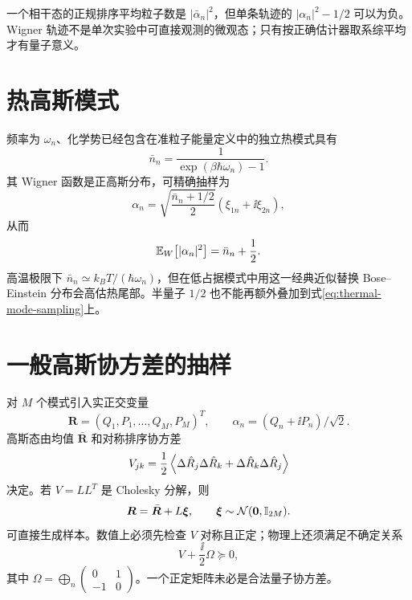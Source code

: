 一个相干态的正规排序平均粒子数是 $|\bar\alpha_n|^2$，但单条轨迹的 $|\alpha_n|^2-1/2$ 可以为负。Wigner 轨迹不是单次实验中可直接观测的微观态；只有按正确估计器取系综平均才有量子意义。

\section{热高斯模式}

频率为 $\omega_n$、化学势已经包含在准粒子能量定义中的独立热模式具有
\begin{equation}
  \bar n_n=\frac{1}{\exp(\beta\hbar\omega_n)-1}.
\end{equation}
其 Wigner 函数是正高斯分布，可精确抽样为
\begin{equation}
  \alpha_n=\sqrt{\frac{\bar n_n+1/2}{2}}
  (\xi_{1n}+\ii\xi_{2n}),
  \label{eq:thermal-mode-sampling}
\end{equation}
从而
\begin{equation}
  \mathbb{E}_{W}\!\left[|\alpha_n|^2\right]=\bar n_n+\frac12.
  \label{eq:thermal-wigner-moment}
\end{equation}
高温极限下 $\bar n_n\simeq k_BT/(\hbar\omega_n)$，但在低占据模式中用这一经典近似替换 Bose--Einstein 分布会高估热尾部。半量子 $1/2$ 也不能再额外叠加到式\eqref{eq:thermal-mode-sampling}上。

\section{一般高斯协方差的抽样}

对 $M$ 个模式引入实正交变量
\begin{equation}
  \bm R=(Q_1,P_1,\ldots,Q_M,P_M)^T,
  \qquad
  \alpha_n=(Q_n+\ii P_n)/\sqrt2.
\end{equation}
高斯态由均值 $\bar{\bm R}$ 和对称排序协方差
\begin{equation}
  V_{jk}=\frac12\left\langle 
  \Delta\hat R_j\Delta\hat R_k+
  \Delta\hat R_k\Delta\hat R_j\right\rangle
  \label{eq:gaussian-covariance-definition}
\end{equation}
决定。若 $V=LL^T$ 是 Cholesky 分解，则
\begin{equation}
  \bm R=\bar{\bm R}+L\bm\xi,
  \qquad
  \bm\xi\sim\mathcal N(\bm0,\mathbb{I}_{2M}).
  \label{eq:initial-gaussian-cholesky-sampling}
\end{equation}
可直接生成样本。数值上必须先检查 $V$ 对称且正定；物理上还须满足不确定关系
\begin{equation}
  V+\frac{\ii}{2}\Omega\succeq0,
  \label{eq:gaussian-uncertainty}
\end{equation}
其中 $\Omega=\bigoplus_n\begin{pmatrix}0&1\\-1&0\end{pmatrix}$。一个正定矩阵未必是合法量子协方差。

